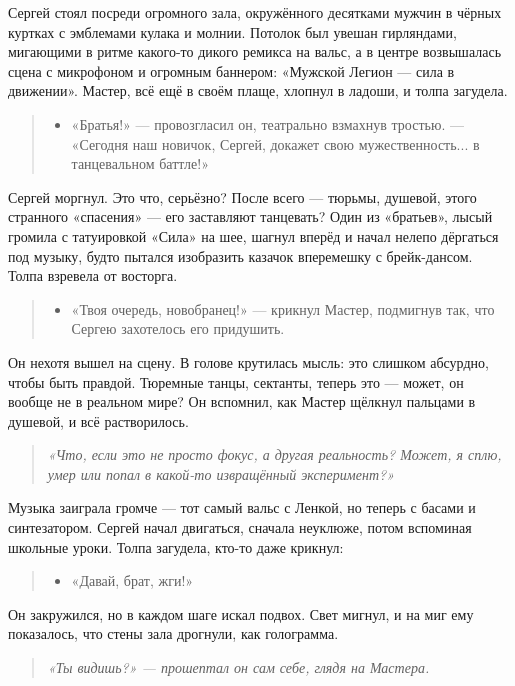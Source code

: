 \documentclass[12pt,a4paper]{book}
\newenvironment{dialogue}{\begin{quote}\itshape\begin{itemize}\item[]}{\end{itemize}\end{quote}}
\newenvironment{innerthought}{\begin{quote}\small\itshape}{\end{quote}}
\begin{document}
Сергей стоял посреди огромного зала, окружённого десятками мужчин в чёрных куртках с эмблемами кулака и молнии. Потолок был увешан гирляндами, мигающими в ритме какого-то дикого ремикса на вальс, а в центре возвышалась сцена с микрофоном и огромным баннером: «Мужской Легион — сила в движении». Мастер, всё ещё в своём плаще, хлопнул в ладоши, и толпа загудела.

\begin{dialogue}
«Братья!» --- провозгласил он, театрально взмахнув тростью. --- «Сегодня наш новичок, Сергей, докажет свою мужественность... в танцевальном баттле!»
\end{dialogue}

Сергей моргнул. Это что, серьёзно? После всего --- тюрьмы, душевой, этого странного «спасения» --- его заставляют танцевать? Один из «братьев», лысый громила с татуировкой «Сила» на шее, шагнул вперёд и начал нелепо дёргаться под музыку, будто пытался изобразить казачок вперемешку с брейк-дансом. Толпа взревела от восторга.

\begin{dialogue}
«Твоя очередь, новобранец!» --- крикнул Мастер, подмигнув так, что Сергею захотелось его придушить.
\end{dialogue}

Он нехотя вышел на сцену. В голове крутилась мысль: это слишком абсурдно, чтобы быть правдой. Тюремные танцы, сектанты, теперь это --- может, он вообще не в реальном мире? Он вспомнил, как Мастер щёлкнул пальцами в душевой, и всё растворилось.

\begin{innerthought}
«Что, если это не просто фокус, а другая реальность? Может, я сплю, умер или попал в какой-то извращённый эксперимент?»
\end{innerthought}

Музыка заиграла громче --- тот самый вальс с Ленкой, но теперь с басами и синтезатором. Сергей начал двигаться, сначала неуклюже, потом вспоминая школьные уроки. Толпа загудела, кто-то даже крикнул:

\begin{dialogue}
«Давай, брат, жги!»
\end{dialogue}

Он закружился, но в каждом шаге искал подвох. Свет мигнул, и на миг ему показалось, что стены зала дрогнули, как голограмма.

\begin{innerthought}
«Ты видишь?» --- прошептал он сам себе, глядя на Мастера.
\end{innerthought}
\end{document}

